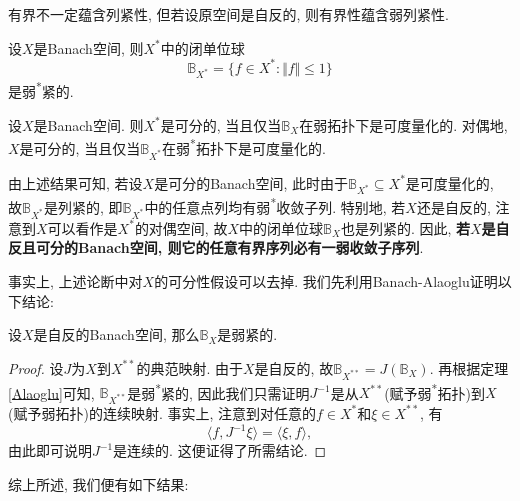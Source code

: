 有界不一定蕴含列紧性, 但若设原空间是自反的, 则有界性蕴含弱列紧性. 

\begin{theorem}\label{Alaoglu}
    设$X$是Banach空间, 则$X^*$中的闭单位球
    \begin{equation*}
        \mathbb{B}_{X^*} = \{f \in X^*\colon \Vert f \Vert \leq 1\}
    \end{equation*}
    是弱\textsuperscript{*}紧的.
\end{theorem}

\begin{proposition}
    设$X$是Banach空间. 则$X^*$是可分的, 当且仅当$\mathbb{B}_X$在弱拓扑下是可度量化的.
    对偶地, $X$是可分的, 当且仅当$\mathbb{B}_{X^*}$在弱\textsuperscript{*}拓扑下是可度量化的.
\end{proposition}

由上述结果可知, 若设$X$是可分的Banach空间, 此时由于$\mathbb{B}_{X^*} \subseteq X^*$是可度量化的, 故$\mathbb{B}_{X^*}$是列紧的, 即$\mathbb{B}_{X^*}$中的任意点列均有弱\textsuperscript{*}收敛子列.
特别地, 若$X$还是自反的, 注意到$X$可以看作是$X^*$的对偶空间, 故$X$中的闭单位球$\mathbb{B}_X$也是列紧的. 
因此, \textbf{若$X$是自反且可分的Banach空间, 则它的任意有界序列必有一弱收敛子序列}.

事实上, 上述论断中对$X$的可分性假设可以去掉. 我们先利用Banach-Alaoglu证明以下结论:

\begin{theorem}\label{Kakutani}
    设$X$是自反的Banach空间, 那么$\mathbb{B}_X$是弱紧的. 
    \begin{proof}
        设$J$为$X$到$X^{**}$的典范映射. 由于$X$是自反的, 故$\mathbb{B}_{X^{**}} = J(\mathbb{B}_X)$.
        再根据定理\ref{Alaoglu}可知, $\mathbb{B}_{X^{**}}$是弱\textsuperscript{*}紧的, 因此我们只需证明$J^{-1}$是从$X^{**}$(赋予弱\textsuperscript{*}拓扑)到$X$(赋予弱拓扑)的连续映射.
        事实上, 注意到对任意的$f \in X^*$和$\xi \in X^{**}$, 有 
        \begin{equation*}
            \langle f, J^{-1}\xi\rangle = \langle \xi, f\rangle,
        \end{equation*}
        由此即可说明$J^{-1}$是连续的. 这便证得了所需结论.
    \end{proof}
\end{theorem}

综上所述, 我们便有如下结果:

